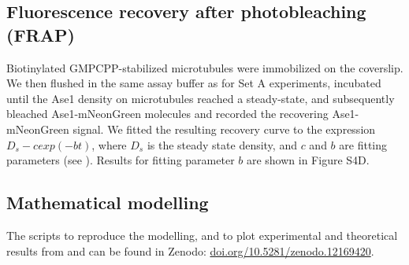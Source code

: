 \subsection{Fluorescence recovery after photobleaching (FRAP)}
Biotinylated GMPCPP-stabilized microtubules were immobilized on the coverslip. We then flushed in the same assay buffer as for Set A experiments, incubated until the Ase1 density on microtubules reached a steady-state, and subsequently bleached Ase1-mNeonGreen molecules and recorded the recovering Ase1-mNeonGreen signal. We fitted the resulting recovery curve to the expression $D_s - c exp(-bt)$, where $D_s$ is the steady state density, and $c$ and $b$ are fitting parameters (see ). Results for fitting parameter $b$ are shown in Figure S4D.

\subsection{Mathematical modelling}
The scripts to reproduce the modelling, and to plot experimental and theoretical results from  and  can be found in Zenodo: \url{doi.org/10.5281/zenodo.12169420}. 
